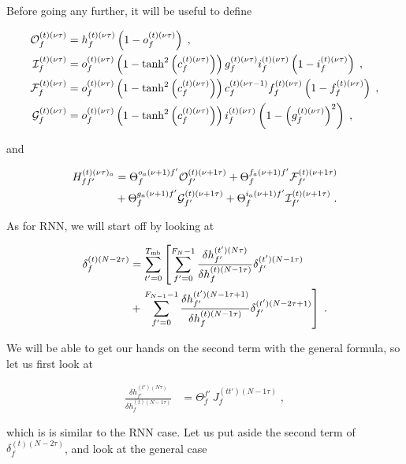 \begin{subappendices}
Before  going any further, it will be useful to define 

\begin{align}
\mathcal{O}^{(t)(\nu\tau)}_{f}&=h^{(t)(\nu\tau)}_{f}
%
\left(1-o^{(t)(\nu\tau)}_{f}\right)\;,\notag\\
%
\mathcal{I}^{(t)(\nu\tau)}_{f}&=o^{(t)(\nu\tau)}_{f}\left(1-\tanh^2\left(c^{(t)(\nu\tau)}_{f}\right)
%
\right)g^{(t)(\nu\tau)}_{f} i^{(t)(\nu\tau)}_{f}\left(1-i^{(t)(\nu\tau)}_{f}\right)\;,\notag\\
%
\mathcal{F}^{(t)(\nu\tau)}_{f}&=o^{(t)(\nu\tau)}_{f}\left(1-\tanh^2\left(c^{(t)(\nu\tau)}_{f}\right)
%
\right)c^{(t)(\nu\tau-1)}_{f} f^{(t)(\nu\tau)}_{f}\left(1-f^{(t)(\nu\tau)}_{f}\right)\;,\notag\\
%
\mathcal{G}^{(t)(\nu\tau)}_{f}&=o^{(t)(\nu\tau)}_{f}\left(1-\tanh^2\left(c^{(t)(\nu\tau)}_{f}\right)
%
\right)i^{(t)(\nu\tau)}_{f}\left(1-\left(g^{(t)(\nu\tau)}_{f}\right)^2\right)\;,
\end{align}

and

\begin{align}
H^{(t)(\nu\tau)_a}_{ff'}&=\Theta^{o_a(\nu+1)f'}_{f}\mathcal{O}^{(t)(\nu+1\tau)}_{f'}
%
+\Theta^{f_a(\nu+1)f'}_{f}\mathcal{F}^{(t)(\nu+1\tau)}_{f'}\notag\\
%
&+\Theta^{g_a(\nu+1)f'}_{f}\mathcal{G}^{(t)(\nu+1\tau)}_{f'}
%
+\Theta^{i_a(\nu+1)f'}_{f}\mathcal{I}^{(t)(\nu+1\tau)}_{f'}\;.
\end{align}

As for RNN, we will start off by looking at 

\begin{align}
\delta^{(t)(N-2\tau)}_f&= \sum_{t'=0}^{T_{{\rm mb}}}\left[\sum_{f'=0}^{F_{N}-1}
%
\frac{\delta h^{(t')(N\tau)}_{f'}}{\delta h^{(t)(N-1\tau)}_f }\delta^{(t')(N-1\tau)}_{f'}\right.\notag\\
%
&+\left.\sum_{f'=0}^{F_{N-1}-1}\frac{\delta h^{(t')(N-1\tau+1)}_{f'}}{\delta h^{(t)(N-1\tau)}_f }\delta^{(t')(N-2\tau+1)}_{f'}\right]\;.
\end{align}

We will be able to get our hands on the second term with the general formula, so let us first look at

\begin{align}
\frac{\delta h^{(t')(N\tau)}_{f'}}{\delta h^{(t)(N-1\tau)}_f }&=\Theta^{f'}_{f}\,J_f^{(tt')(N-1\tau)}\;,
\end{align}

which is is similar to the RNN case. Let us put aside the second term of $\delta^{(t)(N-2\tau)}_f$, and look at the general case


\end{subappendices}
